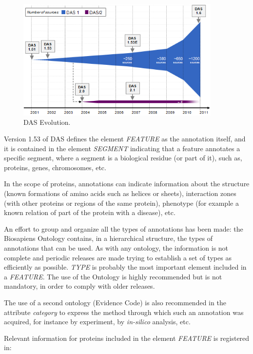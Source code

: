 \begin{figure}  
\centering
\includegraphics[width=4in]{figures/DasEvolution2.PNG}
\caption[DAS Evolution.]{DAS Evolution.
\label{fig:dasevolution}}
\end{figure}

Version 1.53 of DAS defines the element \emph{FEATURE} as the annotation itself, and it is contained in the element \emph{SEGMENT} indicating that a feature annotates a specific segment, where a segment is a biological residue (or part of it), such as, proteins, genes, chromosomes, etc.

In the scope of proteins, annotations can indicate information about the structure (known formations of amino acids such as helices or sheets), interaction zones (with other proteins or regions of the same protein), phenotype (for example a known relation of part of the protein with a disease), etc. 

An effort to group and organize all the types of annotations has been made: the Biosapiens Ontology contains, in a hierarchical structure, the types of annotations that can be used. As with any ontology, the information is not complete and periodic releases are made trying to establish a set of types as efficiently as possible.  \emph{TYPE} is probably the most important element included in a \emph{FEATURE}. The use of the Ontology is highly recommended but is not mandatory, in order to comply with older releases. 

The use of a second ontology (Evidence Code) is also recommended in the attribute \emph{category} to express the method through which such an annotation was acquired, for instance by experiment, by \emph{in-silico} analysis, etc.

Relevant information for proteins included in the element \emph{FEATURE} is registered in:

